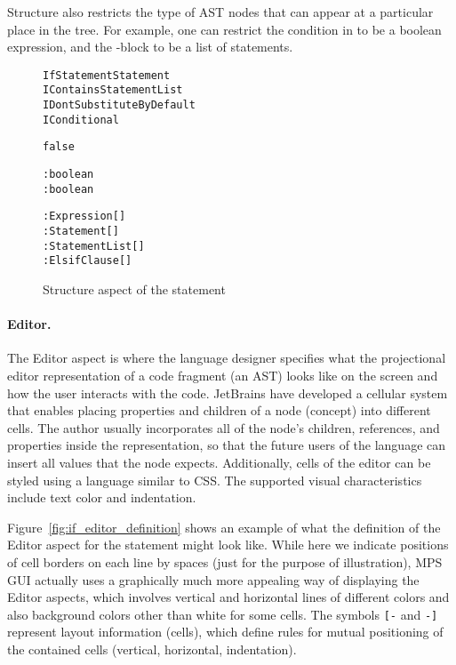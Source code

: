 Structure also restricts the type of AST nodes that can appear at a particular place in the tree.
For example, one can restrict the condition in  to be a boolean expression, and the -block to be a list of statements.

\begin{figure}[ht]
\centering
\begin{alltt}
\small
{} IfStatement  Statement
         IContainsStatementList
                   IDontSubstituteByDefault
                   IConditional

   false
   
   

     : boolean
   : boolean
  
          : Expression[]
   : Statement[]
             : StatementList[]
       : ElsifClause[]
  
\end{alltt}
\caption{Structure aspect of the  statement}
\label{fig:if_statement_structure}
\end{figure}

\paragraph{Editor.}
The Editor aspect is where the language designer specifies what the projectional editor representation of a code fragment (an AST) looks like on the screen and how the user interacts with the code.
JetBrains have developed a cellular system that enables placing properties and children of a node (concept) into different cells.
The author usually incorporates all of the node's children, references, and properties inside the representation, so that the future users of the language can insert all values that the node expects.
Additionally, cells of the editor can be styled using a language similar to CSS.
The supported visual characteristics include text color and indentation.

Figure~\ref{fig:if_editor_definition} shows an example of what the definition of the Editor aspect for the  statement might look like.
While here we indicate positions of cell borders on each line by spaces (just for the purpose of illustration), MPS GUI actually uses a graphically much more appealing way of displaying the Editor aspects, which involves vertical and horizontal lines of different colors and also background colors other than white for some cells.
The symbols \verb|[-| and \verb|-]| represent layout information (cells), which define rules for mutual positioning of the contained cells (vertical, horizontal, indentation).

